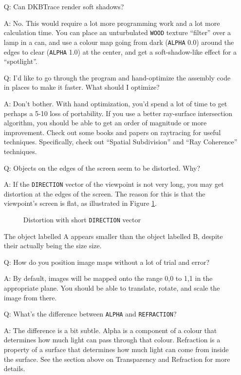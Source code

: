\begin{itemize}
\item[Q:] Can DKBTrace render soft shadows?
\item[A:] No.  This would require a lot more programming work and a lot more
calculation time.  You can place an unturbulated {\tt WOOD}
texture ``filter'' over a lamp in a can, and use a colour map going from dark
({\tt ALPHA} 0.0) around the edges to clear
({\tt ALPHA} 1.0) at the center, and get a soft-shadow-like effect for
a ``spotlight''.

\item[Q:] I'd like to go through the program and hand-optimize the
assembly code in places to make it faster.
What should I optimize?
\item[A:] Don't bother.  With hand optimization, you'd spend a lot of
time to get perhaps a 5-10%
loss of portability.  If you use a better ray-surface intersection
algorithm, you should be able to get an order of magnitude or more
improvement.  Check out some books and papers on raytracing for useful
techniques.  Specifically, check out ``Spatial Subdivision'' and ``Ray
Coherence'' techniques.

\item[Q:] Objects on the edges of the screen seem to be
distorted.  Why?
\item[A:] If the {\tt DIRECTION} vector of the
viewpoint is not very
long, you may get distortion at the edges of the screen.  The reason
for this is that the viewpoint's screen is flat, as illustrated in
Figure \ref{distort}.
\begin{figure}[htbp]
\begin{centering}

\caption{Distortion with short {\tt DIRECTION} vector}
\label{distort}
\end{centering}
\end{figure}
The object labelled A appears smaller than the object labelled B,
despite their actually being the size size.

\item[Q:] How do you position
image maps without a lot of trial and error?
\item[A:] By default, images will be mapped onto the range 0,0 to 1,1 in the
appropriate plane.  You should be able to translate, rotate, and
scale the image from there.

\item[Q:] What's the difference between {\tt ALPHA}
and {\tt REFRACTION}?
\item[A:] The difference is a bit subtle.  Alpha is a component of
a colour that determines how much light can pass through that colour.
Refraction is a property of a surface that determines how much light
can come from inside the surface.  See the section above on
Transparency and Refraction for more details.


\end{itemize}
